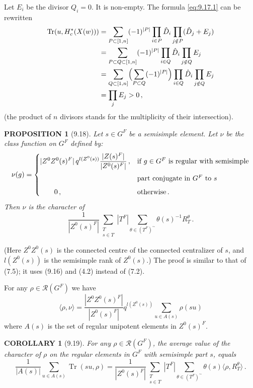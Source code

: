 \documentclass{amsart}
\theoremstyle{plain}
\newtheorem{proposition}[theorem]{PROPOSITION}
\newtheorem{corollary}[theorem]{COROLLARY}
\theoremstyle{remark}
\DeclareMathOperator{\Tr}{Tr}
\begin{document}
Let $E_i$ be the divisor $Q_i = 0$. It is non-empty. The formula \eqref{eq:9.17.1} can be rewritten
\begin{align*}
\Tr(u, H_c^*(X(w)))
&= \sum_{P \subset [1,n]} (-1)^{|P|} \prod_{i \in P} \hat{D}_i \prod_{j \notin P} (\hat{D}_j + E_j) \\
&= \sum_{P \subset Q \subset [1,n]} (-1)^{|P|} \prod_{i \in Q} \hat{D}_i \prod_{j \notin Q} E_j \\
&= \sum_{Q \subset [1,n]} \Bigl(\sum_{P \subset Q} (-1)^{|P|}\Bigr) \prod_{i \in Q} \hat{D}_i \prod_{j \notin Q} E_j \\
&= \prod_j E_j > 0\,,
\end{align*}
(the product of $n$ divisors stands for the multiplicity of their intersection).

\begin{proposition}[9.18]
Let $s \in G^F$ be a semisimple element. Let $\nu$ be the class function on $G^F$ defined by:
\[
\nu(g) = \begin{cases}
\displaystyle |Z^0Z^0(s)^F|\, q^{l(Z^0(s))} \frac{|Z(s)^F|}{|Z^0(s)^F|}\,, & \text{if $g \in G^F$ is regular with semisimple}\\[1em]
& \text{part conjugate in $G^F$ to $s$}\\[0.5em]
\quad\quad 0\,, & \text{otherwise\,.}
\end{cases}
\]
Then $\nu$ is the character of
\[
\frac{1}{|Z^0(s)^F|} \sum_{\substack{T \\ s \in T}} |T^F| \sum_{\theta \in (T^F)^{\sim}} \theta(s)^{-1} R_T^\theta\,.
\]
\end{proposition}

(Here $Z^0Z^0(s)$ is the connected centre of the connected centralizer of $s$, and $l(Z^0(s))$ is the semisimple rank of $Z^0(s)$.) The proof is similar to that of (7.5); it uses (9.16) and (4.2) instead of (7.2).

For any $\rho \in \mathscr{R}(G^F)$ we have
\begin{equation}\label{eq:9.18.1}
\langle \rho, \nu \rangle = \frac{|Z^0Z^0(s)^F|}{|Z^0(s)^F|} q^{l(Z^0(s))} \sum_{u \in A(s)} \rho(su)
\end{equation}
where $A(s)$ is the set of regular unipotent elements in $Z^0(s)^F$.

\begin{corollary}[9.19]
For any $\rho \in \mathscr{R}(G^F)$, the average value of the character of $\rho$ on the regular elements in $G^F$ with semisimple part $s$, equals
\[
\frac{1}{|A(s)|} \sum_{u \in A(s)} \Tr(su, \rho) = \frac{1}{|Z^0(s)^F|} \sum_{\substack{T \\ s \in T}} |T^F| \sum_{\theta \in (T^F)^{\sim}} \theta(s) \langle \rho, R_T^\theta \rangle\,.
\]
\end{corollary}
\end{document}
